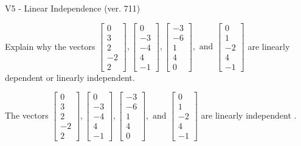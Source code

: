 \begin{exercise}
  \begin{exerciseTitle}V5 - Linear Independence (ver. 711)\end{exerciseTitle}
  \begin{exerciseStatement}
    Explain why the vectors \(\left[\begin{array}{r}
0 \\
3 \\
2 \\
-2 \\
2
\end{array}\right] , \left[\begin{array}{r}
0 \\
-3 \\
-4 \\
4 \\
-1
\end{array}\right] , \left[\begin{array}{r}
-3 \\
-6 \\
1 \\
4 \\
0
\end{array}\right] , \text{ and } \left[\begin{array}{r}
0 \\
1 \\
-2 \\
4 \\
-1
\end{array}\right]\) are linearly dependent or linearly independent.	


  \end{exerciseStatement}
  \begin{exerciseAnswer}
   The vectors \(\left[\begin{array}{r}
0 \\
3 \\
2 \\
-2 \\
2
\end{array}\right] , \left[\begin{array}{r}
0 \\
-3 \\
-4 \\
4 \\
-1
\end{array}\right] , \left[\begin{array}{r}
-3 \\
-6 \\
1 \\
4 \\
0
\end{array}\right] , \text{ and } \left[\begin{array}{r}
0 \\
1 \\
-2 \\
4 \\
-1
\end{array}\right]\) are 
  	 linearly independent  .
  


  \end{exerciseAnswer}
\end{exercise}